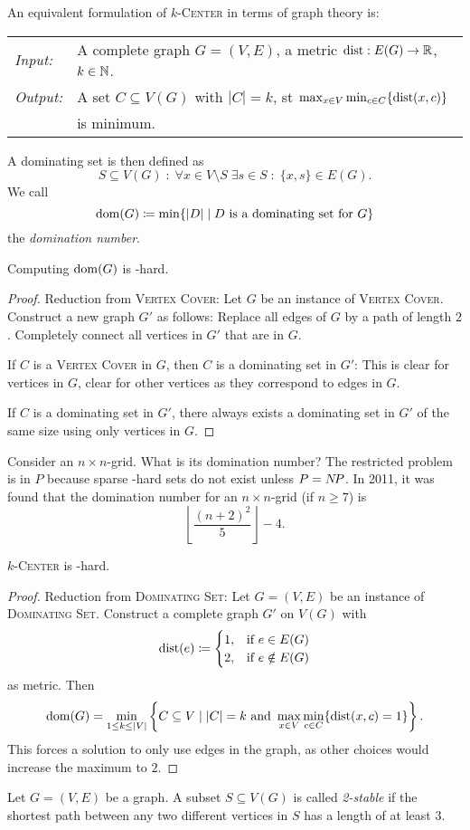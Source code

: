 \documentclass[../skript.tex]{subfiles}
\begin{document}
An equivalent formulation of \textsc{$k$-Center} in terms of graph theory is:
\begin{problem}[$k$-Center]
\begin{tabular}{@{}ll}
\textit{Input:} & A complete graph $G = (V, E)$, a metric $\operatorname*{dist} : E(G) \to \mathbb{R}$, $k \in \mathbb{N}$. \\
\textit{Output:} & A set $C \subseteq V(G)$ with $|C| = k$, \ac{st} $\max_{x \in V} \min_{c \in C} \{\operatorname*{dist}(x, c)\}$ \\
& is minimum.
\end{tabular}
\end{problem}
A dominating set is then defined as
\[
	S \subseteq V(G) \; : \; \forall x \in V \setminus S \; \exists s \in S \; : \; \{ x, s \} \in E(G).
\]
We call
\[
	\operatorname{dom}(G) \coloneqq \min \{ |D| \mid D \text{ is a dominating set for } G \}
\]
the \emph{domination number}.
\begin{theorem} %
\label{thm:23}
Computing $\operatorname{dom}(G)$ is \NP-hard.
\end{theorem}
\begin{proof}
Reduction from \textsc{Vertex Cover}: Let $G$ be an instance of \textsc{Vertex Cover}.
Construct a new graph $G'$ as follows: Replace all edges of $G$ by a path of length $2$.
Completely connect all vertices in $G'$ that are in $G$.

If $C$ is a \textsc{Vertex Cover} in $G$, then $C$ is a dominating set in $G'$: This is clear for vertices in $G$, clear for other vertices as they correspond to edges in $G$.

If $C$ is a dominating set in $G'$, there always  exists a dominating set in $G'$ of the same size using only vertices in $G$.
\end{proof}
Consider an $n \times n$-grid. What is its domination number? The restricted problem is in $P$ because sparse \NP-hard sets do not exist unless $P = N \! P$.
In 2011, it was found that the domination number for an $n \times n$-grid (if $n \geq 7$) is
\[
	\left\lfloor \frac{(n+2)^2}{5} \right\rfloor - 4.
\]
\begin{theorem} %
\label{thm:24}
\textsc{$k$-Center} is \NP-hard.
\end{theorem}
\begin{proof}
Reduction from \textsc{Dominating Set}: Let $G = (V, E)$ be an instance of \textsc{Dominating Set}.
Construct a complete graph $G'$ on $V(G)$ with
\[
\operatorname*{dist}(e) \coloneqq \begin{cases}
1, & \text{if } e \in E(G) \\
2, & \text{if } e \notin E(G)
\end{cases}
\]
as metric.
Then
\[
	\operatorname{dom}(G) = \min_{1 \leq k \leq |V|} \left\{ C \subseteq V \mid |C| = k \text{ and } \max_{x \in V} \min_{c \in C} \{ \operatorname*{dist}(x, c) = 1 \} \right\}.
\]
This forces a solution to only use edges in the graph, as other choices would increase the maximum to $2$.
\end{proof}
Let $G = (V, E)$ be a graph. A subset $S \subseteq V(G)$ is called \emph{2-stable} if the shortest path between any two different vertices in $S$ has a length of at least $3$.
\end{document}

